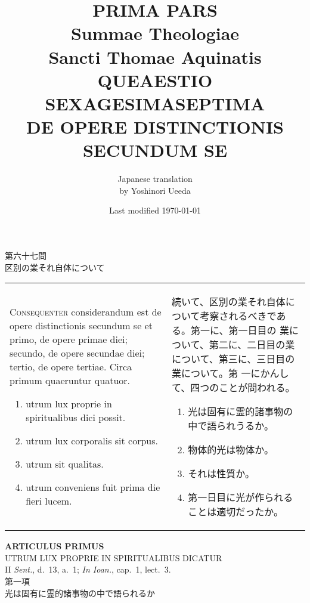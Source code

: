 \documentclass[10pt]{jsarticle} %
\title{{\bf PRIMA PARS}\\{\HUGE Summae Theologiae}\\Sancti Thomae
Aquinatis\\{\sffamily QUEAESTIO SEXAGESIMASEPTIMA}\\DE OPERE
DISTINCTIONIS SECUNDUM SE}
\author{Japanese translation\\by Yoshinori {\sc Ueeda}}
\date{Last modified \today}
\begin{document}
\maketitle
\pagestyle{fancy}

\begin{center}
{\Large 第六十七問\\区別の業それ自体について}
\end{center}

\begin{longtable}{p{21em}p{21em}}
{\scshape Consequenter} considerandum est de opere distinctionis
 secundum se et primo, de opere primae diei; secundo, de opere secundae
 diei; tertio, de opere tertiae. Circa primum quaeruntur quatuor. 

\begin{enumerate}
 \item utrum lux proprie in spiritualibus dici possit.
 \item utrum lux corporalis sit corpus.
 \item utrum sit qualitas.
 \item utrum conveniens fuit prima die fieri lucem.
\end{enumerate}

&

続いて、区別の業それ自体について考察されるべきである。第一に、第一日目の
 業について、第二に、二日目の業について、第三に、三日目の業について。第
 一にかんして、四つのことが問われる。

\begin{enumerate}
 \item 光は固有に霊的諸事物の中で語られうるか。
 \item 物体的光は物体か。
 \item それは性質か。
 \item 第一日目に光が作られることは適切だったか。
\end{enumerate}


\end{longtable}
\newpage

\begin{center}
 {\Large {\bf ARTICULUS PRIMUS}}\\
 {\large UTRUM LUX PROPRIE IN SPIRITUALIBUS DICATUR}\\
 {\footnotesize II {\itshape Sent.}, d.~13, a.~1; {\itshape In Ioan.},
 cap.~1, lect.~3.}\\
 {\Large 第一項\\光は固有に霊的諸事物の中で語られるか}
\end{center}
\end{document}
